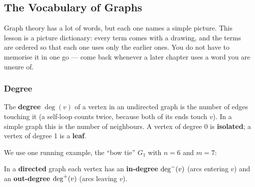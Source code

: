 \subsection{The Vocabulary of Graphs}
\label{ssec:ch1-vocabulary}

Graph theory has a lot of words, but each one names a simple picture. This lesson is a picture dictionary: every term comes with a drawing, and the terms are ordered so that each one uses only the earlier ones. You do not have to memorise it in one go --- come back whenever a later chapter uses a word you are unsure of.

\subsubsection*{Degree}

The \textbf{degree} $\deg(v)$ of a vertex in an undirected graph is the number of edges touching it (a self-loop counts twice, because both of its ends touch $v$). In a simple graph this is the number of neighbours. A vertex of degree 0 is \textbf{isolated}; a vertex of degree 1 is a \textbf{leaf}.

We use one running example, the ``bow tie'' $G_1$ with $n=6$ and $m=7$:

\begin{diagrambox}
\end{diagrambox}

In a \textbf{directed} graph each vertex has an \textbf{in-degree} $\deg^{-}(v)$ (arcs entering $v$) and an \textbf{out-degree} $\deg^{+}(v)$ (arcs leaving $v$).

